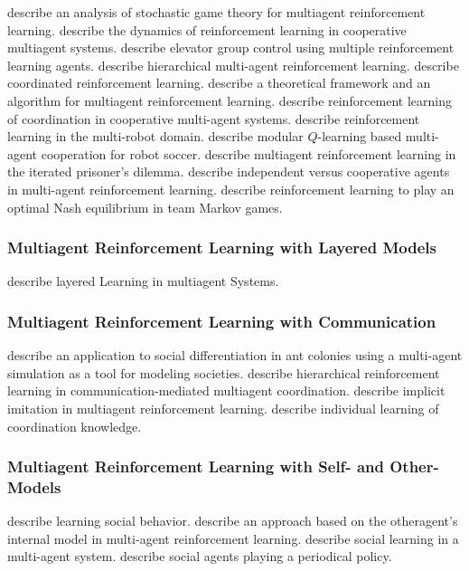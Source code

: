 \cite{bowling2000asg} describe an analysis of stochastic game theory for multiagent reinforcement learning.
\cite{claus1998drl} describe the dynamics of reinforcement learning in cooperative multiagent systems.
\cite{crites1998egc} describe elevator group control using multiple reinforcement learning agents.
\cite{ghavamzadeh2006hma} describe hierarchical multi-agent reinforcement learning.
\cite{guestrin2002crl} describe coordinated reinforcement learning.
\cite{hu1998mrl} describe a theoretical framework and an algorithm for multiagent reinforcement learning.
\cite{kapetanakis2002rlc} describe reinforcement learning of coordination in cooperative multi-agent systems.
\cite{mataric1997rlm} describe reinforcement learning in the multi-robot domain.
\cite{park2001mql} describe modular $Q$-learning based multi-agent cooperation for robot soccer.
\cite{sandholm1996mrl} describe multiagent reinforcement learning in the iterated prisoner's dilemma.
\cite{tan1997mar} describe independent versus cooperative agents in multi-agent reinforcement learning.
\cite{wang2003rlp} describe reinforcement learning to play an optimal Nash equilibrium in team Markov games.

\subsubsection{Multiagent Reinforcement Learning with Layered Models}
\cite{stone1997llm} describe layered Learning in multiagent Systems.

\subsubsection{Multiagent Reinforcement Learning with Communication}

\cite{drogoul1994mas} describe an application to social differentiation in ant colonies using a multi-agent simulation as a tool for modeling societies.
\cite{fischer2004hrl} describe hierarchical reinforcement learning in communication-mediated multiagent coordination.
\cite{price1999iim} describe implicit imitation in multiagent reinforcement learning.
\cite{sen1998ilc} describe individual learning of coordination knowledge.

\subsubsection{Multiagent Reinforcement Learning with Self- and Other- Models}

\cite{matari1997lsb} describe learning social behavior.
\cite{nagayuki2000mar} describe an approach based on the otheragent's internal model in multi-agent reinforcement learning.
\cite{noble2004slm} describe social learning in a multi-agent system.
\cite{nowe2001sap} describe social agents playing a periodical policy.

